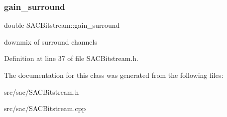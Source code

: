 \subsubsection{\texorpdfstring{gain\+\_\+surround}{gain\_surround}}
{\footnotesize\ttfamily double S\+A\+C\+Bitstream\+::gain\+\_\+surround}

downmix of surround channels 

Definition at line 37 of file S\+A\+C\+Bitstream.\+h.



The documentation for this class was generated from the following files\+:\begin{DoxyCompactItemize}
\item 
src/sac/S\+A\+C\+Bitstream.\+h\item 
src/sac/S\+A\+C\+Bitstream.\+cpp\end{DoxyCompactItemize}
